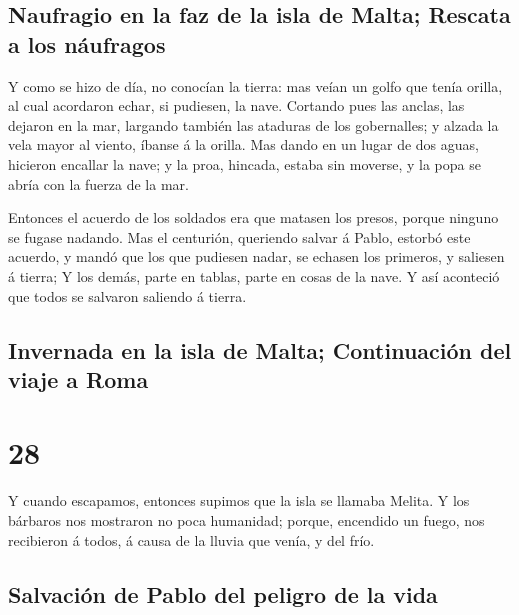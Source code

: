\hypertarget{naufragio-en-la-faz-de-la-isla-de-malta-rescata-a-los-nuxe1ufragos}{%
\subsection{Naufragio en la faz de la isla de Malta; Rescata a los
náufragos}\label{naufragio-en-la-faz-de-la-isla-de-malta-rescata-a-los-nuxe1ufragos}}

 Y como se hizo de día, no conocían la tierra: mas veían
un golfo que tenía orilla, al cual acordaron echar, si pudiesen, la
nave.  Cortando pues las anclas, las dejaron en la mar,
largando también las ataduras de los gobernalles; y alzada la vela mayor
al viento, íbanse á la orilla.  Mas dando en un lugar de
dos aguas, hicieron encallar la nave; y la proa, hincada, estaba sin
moverse, y la popa se abría con la fuerza de la mar.

 Entonces el acuerdo de los soldados era que matasen los
presos, porque ninguno se fugase nadando.  Mas el
centurión, queriendo salvar á Pablo, estorbó este acuerdo, y mandó que
los que pudiesen nadar, se echasen los primeros, y saliesen á tierra;
 Y los demás, parte en tablas, parte en cosas de la nave.
Y así aconteció que todos se salvaron saliendo á tierra.

\hypertarget{invernada-en-la-isla-de-malta-continuaciuxf3n-del-viaje-a-roma}{%
\subsection{Invernada en la isla de Malta; Continuación del viaje a
Roma}\label{invernada-en-la-isla-de-malta-continuaciuxf3n-del-viaje-a-roma}}

\hypertarget{section-27}{%
\section{28}\label{section-27}}

 Y cuando escapamos, entonces supimos que la isla se
llamaba Melita.  Y los bárbaros nos mostraron no poca
humanidad; porque, encendido un fuego, nos recibieron á todos, á causa
de la lluvia que venía, y del frío.

\hypertarget{salvaciuxf3n-de-pablo-del-peligro-de-la-vida}{%
\subsection{Salvación de Pablo del peligro de la
vida}\label{salvaciuxf3n-de-pablo-del-peligro-de-la-vida}}

